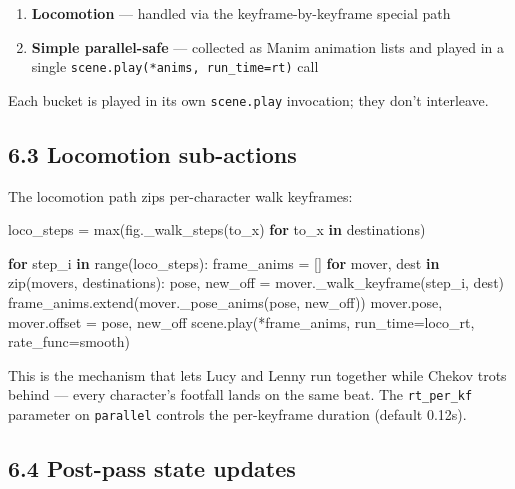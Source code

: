 \documentclass[
  11pt,
]{book}
\newenvironment{Shaded}{}{}
\newcommand{\BuiltInTok}[1]{\textcolor[rgb]{0.00,0.50,0.00}{#1}}
\newcommand{\ControlFlowTok}[1]{\textcolor[rgb]{0.00,0.44,0.13}{\textbf{#1}}}
\newcommand{\KeywordTok}[1]{\textcolor[rgb]{0.00,0.44,0.13}{\textbf{#1}}}
\newcommand{\NormalTok}[1]{#1}
\newcommand{\OperatorTok}[1]{\textcolor[rgb]{0.40,0.40,0.40}{#1}}
\providecommand{\tightlist}{%
  \setlength{\itemsep}{0pt}\setlength{\parskip}{0pt}}
\begin{document}
\begin{enumerate}
\def\labelenumi{\arabic{enumi}.}
\tightlist
\item
  \textbf{Locomotion} --- handled via the keyframe-by-keyframe special
  path
\item
  \textbf{Simple parallel-safe} --- collected as Manim animation lists
  and played in a single \texttt{scene.play(*anims,\ run\_time=rt)} call
\end{enumerate}

Each bucket is played in its own \texttt{scene.play} invocation; they
don't interleave.

\subsection{6.3 Locomotion sub-actions}\label{locomotion-sub-actions}

The locomotion path zips per-character walk keyframes:

\begin{Shaded}
\begin{Highlighting}[]
\NormalTok{loco\_steps }\OperatorTok{=} \BuiltInTok{max}\NormalTok{(fig.\_walk\_steps(to\_x) }\ControlFlowTok{for}\NormalTok{ to\_x }\KeywordTok{in}\NormalTok{ destinations)}

\ControlFlowTok{for}\NormalTok{ step\_i }\KeywordTok{in} \BuiltInTok{range}\NormalTok{(loco\_steps):}
\NormalTok{    frame\_anims }\OperatorTok{=}\NormalTok{ []}
    \ControlFlowTok{for}\NormalTok{ mover, dest }\KeywordTok{in} \BuiltInTok{zip}\NormalTok{(movers, destinations):}
\NormalTok{        pose, new\_off }\OperatorTok{=}\NormalTok{ mover.\_walk\_keyframe(step\_i, dest)}
\NormalTok{        frame\_anims.extend(mover.\_pose\_anims(pose, new\_off))}
\NormalTok{        mover.pose, mover.offset }\OperatorTok{=}\NormalTok{ pose, new\_off}
\NormalTok{    scene.play(}\OperatorTok{*}\NormalTok{frame\_anims, run\_time}\OperatorTok{=}\NormalTok{loco\_rt, rate\_func}\OperatorTok{=}\NormalTok{smooth)}
\end{Highlighting}
\end{Shaded}

This is the mechanism that lets Lucy and Lenny run together while Chekov
trots behind --- every character's footfall lands on the same beat. The
\texttt{rt\_per\_kf} parameter on \texttt{parallel} controls the
per-keyframe duration (default 0.12s).

\subsection{6.4 Post-pass state updates}\label{post-pass-state-updates}
\end{document}
